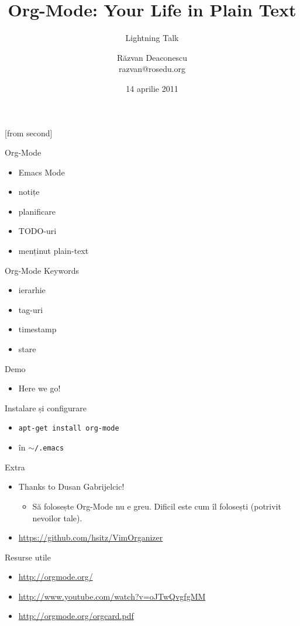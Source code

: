 \documentclass{beamer}
\title[Org-Mode]{Org-Mode: Your Life in Plain Text}
\subtitle{Lightning Talk}
\institute{Întâlnirile RLUG -- Aprilie 2011}
\author[Răzvan Deaconescu]{Răzvan Deaconescu\\
	razvan@rosedu.org}
\date{14 aprilie 2011}
\begin{document}
[from second]

\frame{\titlepage}

\begin{frame}{Org-Mode}
  \begin{itemize}
    \item Emacs Mode
    \item notițe
    \item planificare
    \item TODO-uri
    \item menținut plain-text
  \end{itemize}
\end{frame}

\begin{frame}{Org-Mode Keywords}
  \begin{itemize}
    \item ierarhie
    \item tag-uri
    \item timestamp
    \item stare
  \end{itemize}
\end{frame}

\begin{frame}{Demo}
  \begin{itemize}
    \item Here we go!
  \end{itemize}
\end{frame}

\begin{frame}{Instalare și configurare}
  \begin{itemize}
    \item \texttt{apt-get install org-mode}
    \item în \texttt{$\sim$/.emacs}
  \end{itemize}
  \begin{beamerboxesrounded}[lower=block body,shadow=true]{}
    \scriptsize 
  \end{beamerboxesrounded}
\end{frame}

\begin{frame}{Extra}
  \begin{itemize}
    \item Thanks to Dusan Gabrijelcic!
      \begin{itemize}
        \item Să folosește Org-Mode nu e greu. Dificil este cum îl folosești
        (potrivit nevoilor tale).
      \end{itemize}
    \item \url{https://github.com/hsitz/VimOrganizer}
  \end{itemize}
\end{frame}

\begin{frame}{Resurse utile}
	\begin{itemize}
        \item \url{http://orgmode.org/}
		\item \url{http://www.youtube.com/watch?v=oJTwQvgfgMM}
        \item \url{http://orgmode.org/orgcard.pdf}
    \end{itemize}
\end{frame}
\end{document}
